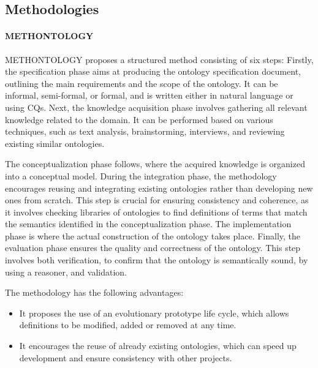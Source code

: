 \subsection{Methodologies}

\paragraph{METHONTOLOGY}
METHONTOLOGY \cite{fernandez1997ontological} proposes a structured method consisting of six steps:  
Firstly, the specification phase aims at producing the ontology specification document, outlining the main requirements and the scope of the ontology.
It can be informal, semi-formal, or formal, and is written either in natural language or using CQs.
Next, the \textsf{knowledge acquisition} phase involves gathering all relevant knowledge related to the domain. 
It can be performed based on various techniques, such as text analysis, brainstorming, interviews, and reviewing existing similar ontologies.

The \textsf{conceptualization} phase follows, where the acquired knowledge is organized into a conceptual model.
During the \textsf{integration} phase, the methodology encourages reusing and integrating existing ontologies rather than developing new ones from scratch. 
This step is crucial for ensuring consistency and coherence, as it involves checking libraries of ontologies to find definitions of terms that match the semantics identified in the conceptualization phase.
The \textsf{implementation} phase is where the actual construction of the ontology takes place.
Finally, the \textsf{evaluation} phase ensures the quality and correctness of the ontology.
This step involves both verification, to confirm that the ontology is semantically sound, by using a reasoner, and validation.

The methodology has the following advantages: 
\begin{itemize}
    \item It proposes the use of an evolutionary prototype life cycle, which allows definitions to be modified, added or removed at any time.

    \item It encourages the reuse of already existing ontologies, which can speed up development and ensure consistency with other projects. 
\end{itemize}


